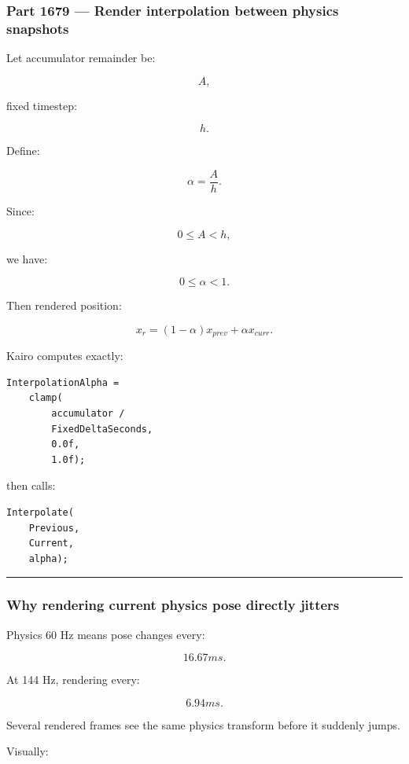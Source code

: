 \subsubsection{Part 1679 --- Render interpolation between physics snapshots}\label{part-1679-render-interpolation-between-physics-snapshots}

Let accumulator remainder be:

\[
A,
\]

fixed timestep:

\[
h.
\]

Define:

\[
\boxed{
\alpha
=
\frac{A}{h}.
}
\]

Since:

\[
0\le A<h,
\]

we have:

\[
0\le\alpha<1.
\]

Then rendered position:

\[
\boxed{
x_r
=
(1-\alpha)x_{prev}
+
\alpha x_{curr}.
}
\]

Kairo computes exactly:

\begin{verbatim}
InterpolationAlpha =
    clamp(
        accumulator /
        FixedDeltaSeconds,
        0.0f,
        1.0f);
\end{verbatim}

then calls:

\begin{verbatim}
Interpolate(
    Previous,
    Current,
    alpha);
\end{verbatim}

\begin{center}\rule{0.5\linewidth}{0.5pt}\end{center}

\subsubsection{Why rendering current physics pose directly jitters}\label{why-rendering-current-physics-pose-directly-jitters}

Physics 60 Hz means pose changes every:

\[
16.67ms.
\]

At 144 Hz, rendering every:

\[
6.94ms.
\]

Several rendered frames see the same physics transform before it suddenly jumps.

Visually:

